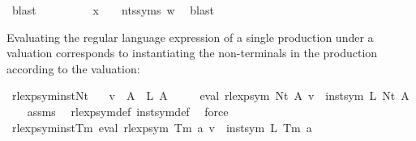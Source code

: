 \begin{isabellebody}
\ blast\isanewline
\ \ \isamarkupfalse%
\ {\isacharasterisk}{\kern0pt}\ {\isacharasterisk}{\kern0pt}{\isacharasterisk}{\kern0pt}\ {\isacharasterisk}{\kern0pt}{\isacharasterisk}{\kern0pt}{\isacharasterisk}{\kern0pt}\ {\isacharasterisk}{\kern0pt}{\isacharasterisk}{\kern0pt}{\isacharasterisk}{\kern0pt}{\isacharasterisk}{\kern0pt}\ \isamarkupfalse%
\ {\isachardoublequoteopen}x\ {\isasymin}\ {\isasymgamma}{\isacharprime}{\kern0pt}\ {\isacharbackquote}{\kern0pt}\ nts{\isacharunderscore}{\kern0pt}syms\ w{\isachardoublequoteclose}\ \isamarkupfalse%
\ blast\isanewline
{}\isamarkupfalse%
%
\endisatagproof
{\isafoldproof}%
%
\isadelimproof
%
\endisadelimproof
%
\begin{isamarkuptext}%
Evaluating the regular language expression of a single production under a valuation
corresponds to instantiating the non-terminals in the production according to the valuation:%
\end{isamarkuptext}\isamarkuptrue%
\isamarkupfalse%
\ rlexp{\isacharunderscore}{\kern0pt}sym{\isacharunderscore}{\kern0pt}inst{\isacharunderscore}{\kern0pt}Nt{\isacharcolon}{\kern0pt}\isanewline
\ \ \ {\isachardoublequoteopen}v\ {\isacharparenleft}{\kern0pt}{\isasymgamma}{\isacharprime}{\kern0pt}\ A{\isacharparenright}{\kern0pt}\ {\isacharequal}{\kern0pt}\ L\ A{\isachardoublequoteclose}\isanewline
\ \ \ \ \ {\isachardoublequoteopen}eval\ {\isacharparenleft}{\kern0pt}rlexp{\isacharunderscore}{\kern0pt}sym\ {\isacharparenleft}{\kern0pt}Nt\ A{\isacharparenright}{\kern0pt}{\isacharparenright}{\kern0pt}\ v\ {\isacharequal}{\kern0pt}\ inst{\isacharunderscore}{\kern0pt}sym\ L\ {\isacharparenleft}{\kern0pt}Nt\ A{\isacharparenright}{\kern0pt}{\isachardoublequoteclose}\isanewline
%
\isadelimproof
\ \ %
\endisadelimproof
%
\isatagproof
{}\isamarkupfalse%
\ assms\ \isamarkupfalse%
\ rlexp{\isacharunderscore}{\kern0pt}sym{\isacharunderscore}{\kern0pt}def\ inst{\isacharunderscore}{\kern0pt}sym{\isacharunderscore}{\kern0pt}def\ \isamarkupfalse%
\ force%
\endisatagproof
{\isafoldproof}%
%
\isadelimproof
\isanewline
%
\endisadelimproof
\isanewline
{}\isamarkupfalse%
\ rlexp{\isacharunderscore}{\kern0pt}sym{\isacharunderscore}{\kern0pt}inst{\isacharunderscore}{\kern0pt}Tm{\isacharcolon}{\kern0pt}\ {\isachardoublequoteopen}eval\ {\isacharparenleft}{\kern0pt}rlexp{\isacharunderscore}{\kern0pt}sym\ {\isacharparenleft}{\kern0pt}Tm\ a{\isacharparenright}{\kern0pt}{\isacharparenright}{\kern0pt}\ v\ {\isacharequal}{\kern0pt}\ inst{\isacharunderscore}{\kern0pt}sym\ L\ {\isacharparenleft}{\kern0pt}Tm\ a{\isacharparenright}{\kern0pt}{\isachardoublequoteclose}\isanewline

\end{isabellebody}
